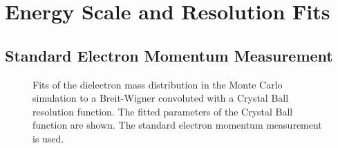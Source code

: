 \documentclass{cmspaper}
\begin{document}
\appendix
\appendixpage

\section{Energy Scale and Resolution Fits}
\label{sec:ScaleAndResolutionFits}
\subsection{Standard Electron Momentum Measurement }

\begin{figure}[h]
\centering
	\caption{Fits of the dielectron mass distribution in the Monte Carlo simulation to
        a Breit-Wigner convoluted with a Crystal Ball resolution function. The fitted parameters 
        of the Crystal Ball function are shown. The standard electron momentum measurement is 
        used.}
	\label{fig:ZMassFit_MC_Standard}
\end{figure}
\end{document}
